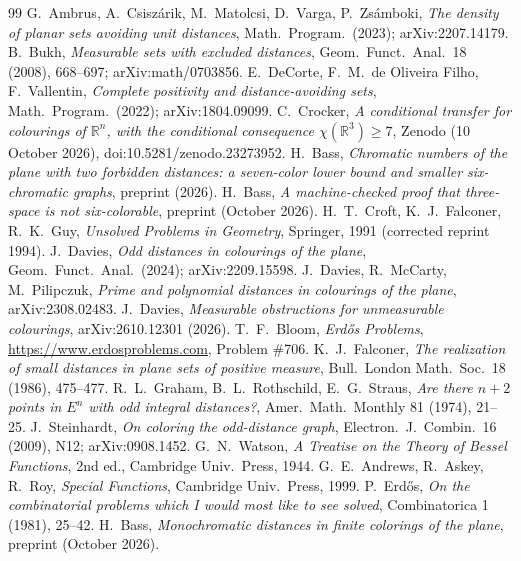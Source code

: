 \documentclass[11pt]{amsart}
\theoremstyle{definition}
\newcommand{\R}{\mathbb{R}}
\begin{document}
\begin{thebibliography}{99}
 G.~Ambrus, A.~Csisz\'arik, M.~Matolcsi, D.~Varga, P.~Zs\'amboki, \emph{The density of planar sets avoiding unit distances}, Math.\ Program.\ (2023); arXiv:2207.14179.
 B.~Bukh, \emph{Measurable sets with excluded distances}, Geom.\ Funct.\ Anal.\ 18 (2008), 668--697; arXiv:math/0703856.
 E.~DeCorte, F.~M.~de Oliveira Filho, F.~Vallentin, \emph{Complete positivity and distance-avoiding sets}, Math.\ Program.\ (2022); arXiv:1804.09099.
 C.~Crocker, \emph{A conditional transfer for colourings of $\R^n$, with the conditional consequence $\chi(\R^3)\ge7$}, Zenodo (10 October 2026), doi:10.5281/zenodo.23273952.
 H.~Bass, \emph{Chromatic numbers of the plane with two forbidden distances: a seven-color lower bound and smaller six-chromatic graphs}, preprint (2026).
 H.~Bass, \emph{A machine-checked proof that three-space is not six-colorable}, preprint (October 2026).
 H.~T.~Croft, K.~J.~Falconer, R.~K.~Guy, \emph{Unsolved Problems in Geometry}, Springer, 1991 (corrected reprint 1994).
 J.~Davies, \emph{Odd distances in colourings of the plane}, Geom.\ Funct.\ Anal.\ (2024); arXiv:2209.15598.
 J.~Davies, R.~McCarty, M.~Pilipczuk, \emph{Prime and polynomial distances in colourings of the plane}, arXiv:2308.02483.
 J.~Davies, \emph{Measurable obstructions for unmeasurable colourings}, arXiv:2610.12301 (2026).
 T.~F.~Bloom, \emph{Erd\H{o}s Problems}, \url{https://www.erdosproblems.com}, Problem \#706.
 K.~J.~Falconer, \emph{The realization of small distances in plane sets of positive measure}, Bull.\ London Math.\ Soc.\ 18 (1986), 475--477.
 R.~L.~Graham, B.~L.~Rothschild, E.~G.~Straus, \emph{Are there $n+2$ points in $E^n$ with odd integral distances?}, Amer.\ Math.\ Monthly 81 (1974), 21--25.
 J.~Steinhardt, \emph{On coloring the odd-distance graph}, Electron.\ J.\ Combin.\ 16 (2009), N12; arXiv:0908.1452.
 G.~N.~Watson, \emph{A Treatise on the Theory of Bessel Functions}, 2nd ed., Cambridge Univ.\ Press, 1944.
 G.~E.~Andrews, R.~Askey, R.~Roy, \emph{Special Functions}, Cambridge Univ.\ Press, 1999.
 P.~Erd\H{o}s, \emph{On the combinatorial problems which I would most like to see solved}, Combinatorica 1 (1981), 25--42.
 H.~Bass, \emph{Monochromatic distances in finite colorings of the plane}, preprint (October 2026).

\end{thebibliography}
\end{document}
